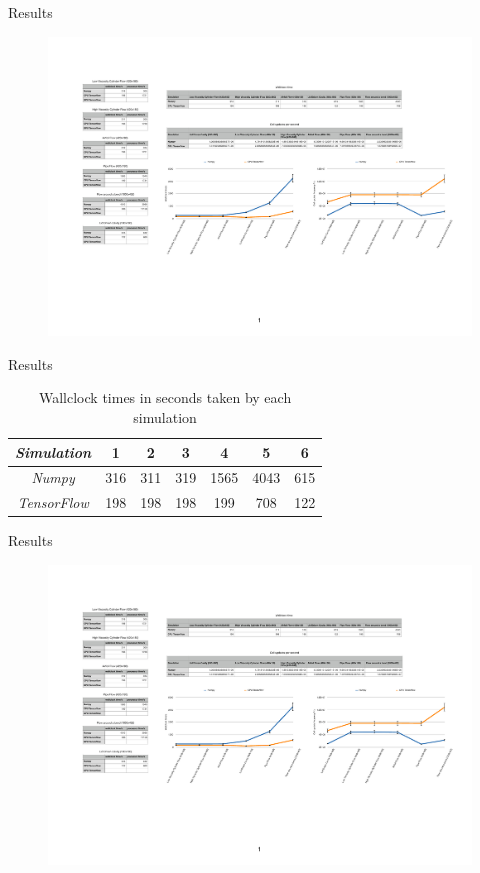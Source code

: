 \documentclass{beamer}
\begin{document}
\begin{frame}{Results}


\begin{figure}[H] 
	\centering
	\label{videoCuts}
	\includegraphics[width=4.5in]{Diagrams/TimeGraph.pdf}
\end{figure}

\end{frame}

\begin{frame}{Results}

\begin{table}[H]
\caption{Wallclock times in seconds taken by each simulation}
\begin{center}
\begin{tabular}{c||c|c|c|c|c|c}
\emph{Simulation} & 1 & 2 & 3 & 4 & 5 & 6\\
\hline
\hline
\emph{Numpy} & 316 & 311 & 319 & 1565 & 4043 & 615 \\
\hline
\emph{TensorFlow} & 198 & 198 & 198 & 199 & 708 & 122 \\
\hline
\end{tabular}
\end{center}
\end{table}

\end{frame}

\begin{frame}{Results}

\begin{figure}[H] 
	\centering
	\label{videoCuts}
	\includegraphics[width=4.5in]{Diagrams/FreqGraph.pdf}
\end{figure}

\end{frame}
\end{document}
